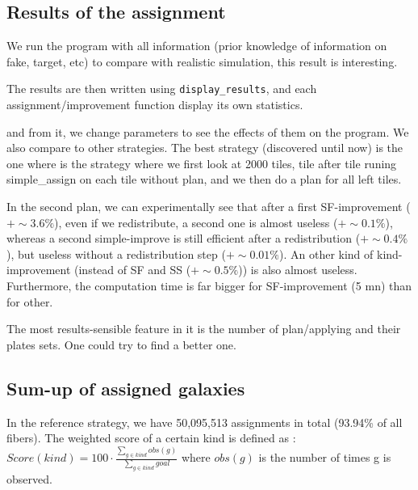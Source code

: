 \documentclass{extarticle}
\begin{document}
\begin{multicols}{2}
\subsection{Results of the assignment}
We run the program with all information (prior knowledge of information on fake, target, etc) to compare with realistic simulation, this result is interesting.

The results are then written using {\tt display\_results}, and each assignment/improvement function display its own statistics.

 and from it, we change parameters to see the effects of them on the program. We also compare to other strategies. The best strategy (discovered until now) is the one where is the strategy where we first look at 2000 tiles, tile after tile runing simple\_assign on each tile without plan, and we then do a plan for all left tiles.

In the second plan, we can experimentally see that after a first SF-improvement ($+\sim 3.6\%$), even if we redistribute, a second one is almost useless ($+\sim 0.1\%$), whereas a second simple-improve is still efficient after a redistribution ($+\sim 0.4\%$), but useless without a redistribution step ($+\sim 0.01\%$). An other kind of kind-improvement (instead of SF and SS ($+\sim 0.5\%$)) is also almost useless. Furthermore, the computation time is far bigger for SF-improvement (5 mn) than for other.

The most results-sensible feature in it is the number of plan/applying and their plates sets. One could try to find a better one.

\end{multicols}

\subsection{Sum-up of assigned galaxies}
In the reference strategy, we have 50,095,513 assignments in total (93.94\% of all fibers). The weighted score of a certain kind is defined as : 
\vspace{1\baselineskip}
$Score(kind) = 100\cdot \frac{\sum\nolimits_{g \in kind} obs(g)}{\sum\nolimits_{g \in kind} goal}$ where $obs(g)$ is the number of times g is observed.
\end{document}
